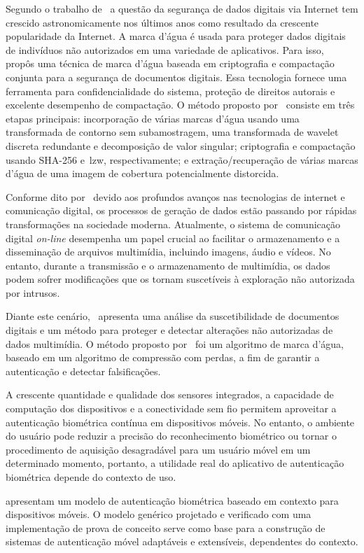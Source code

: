 Segundo o trabalho de~\textcite{singh2021} a questão da segurança de dados
digitais via Internet tem crescido astronomicamente nos últimos anos como
resultado da crescente popularidade da Internet.
A marca d'água é usada para proteger dados digitais de indivíduos não
autorizados em uma variedade de aplicativos.
Para isso,~\textcite{singh2021} propôs uma técnica de marca d'água baseada em
criptografia e compactação conjunta para a segurança de documentos digitais.
Essa tecnologia fornece uma ferramenta para confidencialidade do sistema,
proteção de direitos autorais e excelente desempenho de compactação.
O método proposto por~\textcite{singh2021} consiste em três etapas principais:
incorporação de várias marcas d'água usando uma transformada de contorno sem
subamostragem, uma transformada de wavelet discreta redundante e decomposição
de valor singular; criptografia e compactação usando SHA-256 e~\acrfull{lzw},
respectivamente; e extração/recuperação de várias marcas d'água de uma imagem
de cobertura potencialmente distorcida.

Conforme dito por~\textcite{kabir2021} devido aos profundos avanços nas
tecnologias de internet e comunicação digital,
os processos de geração de dados estão passando por rápidas transformações na
sociedade moderna.
Atualmente, o sistema de comunicação digital \textit{on-line} desempenha um
papel
crucial ao facilitar o armazenamento e a disseminação de arquivos multimídia,
incluindo imagens, áudio e vídeos.
No entanto, durante a transmissão e o armazenamento de multimídia,
os dados podem sofrer modificações que os tornam suscetíveis à exploração
não autorizada por intrusos\cite{kabir2021}.

Diante este cenário,~\textcite{kabir2021} apresenta uma análise da
suscetibilidade de documentos digitais e um método para proteger e detectar
alterações não autorizadas de dados multimídia.
O método proposto por~\textcite{kabir2021} foi um algoritmo de marca d'água,
baseado em um algoritmo de compressão com perdas, a fim de garantir a
autenticação e detectar falsificações.

A crescente quantidade e qualidade dos sensores integrados, a capacidade de
computação
dos dispositivos e a conectividade sem fio permitem aproveitar a autenticação
biométrica contínua em dispositivos móveis.
No entanto, o ambiente do usuário pode reduzir a precisão do reconhecimento
biométrico ou tornar o procedimento de aquisição desagradável para um usuário
móvel em um determinado momento, portanto, a utilidade real do aplicativo de
autenticação biométrica depende do contexto de uso\cite{wojtowicz2016}.

\textcite{wojtowicz2016} apresentam um modelo de autenticação biométrica baseado
em contexto para dispositivos móveis.
O modelo genérico projetado e verificado com uma implementação de prova de
conceito
serve como base para a construção de sistemas de autenticação móvel adaptáveis e
extensíveis, dependentes do contexto.